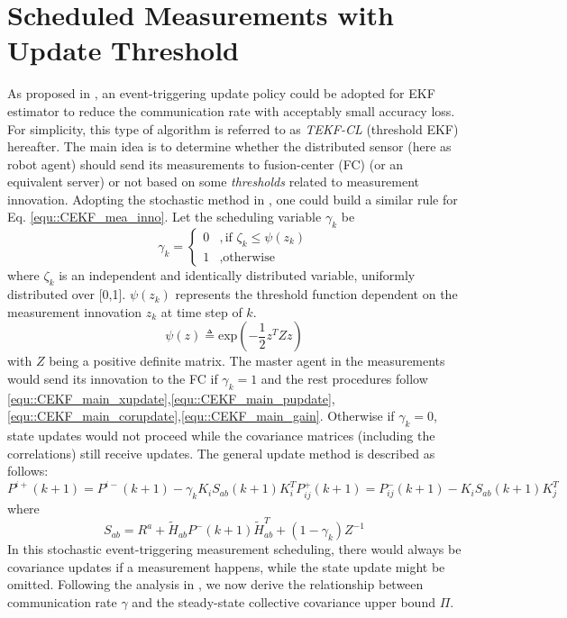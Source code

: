 \documentclass[conference]{IEEEtran}
\begin{document}
\section{Scheduled Measurements with Update Threshold}
As proposed in \cite{you2012kalman,you2013kalman,wang2013sequential,wu2013eventbased,han2015stochastic}, an event-triggering update policy could be adopted for EKF estimator to reduce the communication rate with acceptably small accuracy loss.
For simplicity, this type of algorithm is referred to as \emph{TEKF-CL} (threshold EKF) hereafter.
The main idea is to determine whether the distributed sensor (here as robot agent) should send its measurements to fusion-center (FC) (or an equivalent server) or not based on some \emph{thresholds} related to measurement innovation.
Adopting the stochastic method in \cite{han2013stochastic,han2015stochastic} , one could build a similar rule for Eq. \eqref{equ::CEKF_mea_inno}. Let the scheduling variable $\gamma_k$ be
\begin{equation}
	\gamma_k = \begin{cases}
	0 &, \text{if }\zeta_k \leq \psi(z_k) \\
	1 &, \text{otherwise}
	\end{cases}
	\label{equ::TEKF_gamma_k}
\end{equation}
where $\zeta_k$ is an independent and identically distributed variable, uniformly distributed over [0,1].
$\psi(z_k)$ represents the threshold function dependent on the measurement innovation $z_k$ at time step of $k$.
\begin{equation}
	\psi(z) \triangleq \text{exp}(-\frac{1}{2}z^T Z z)
\end{equation}
with $Z$ being a positive definite matrix.
The master agent in the measurements would send its innovation to the FC if $\gamma_k =1$ and the rest procedures follow \eqref{equ::CEKF_main_xupdate},\eqref{equ::CEKF_main_pupdate},\eqref{equ::CEKF_main_corupdate},\eqref{equ::CEKF_main_gain}. Otherwise if $\gamma_k=0$, state updates would not proceed while the covariance matrices (including the correlations) still receive updates.
The general update method is described as follows:
\begin{subequations}
\begin{equation}
P^{i+}(k+1) = P^{i-}(k+1) - \gamma_k K_iS_{ab}(k+1)K_i^T
\end{equation}
\begin{equation}
P_{ij}^+(k+1) = P_{ij}^-(k+1) - K_iS_{ab}(k+1)K_j^T
\end{equation}
\label{equ::TEKF_update}
\end{subequations}
where
\begin{equation}
S_{ab} = R^a + \tilde{H}_{ab}P^-(k+1)\tilde{H}^T_{ab} + (1-\gamma_k)Z^{-1}
\end{equation}
In this stochastic event-triggering measurement scheduling, there would always be covariance updates if a measurement happens, while the state update might be omitted.
Following the analysis in \cite{han2015stochastic}, we now derive the relationship between communication rate $\gamma$ and the steady-state collective covariance upper bound $\Pi$.
\end{document}
